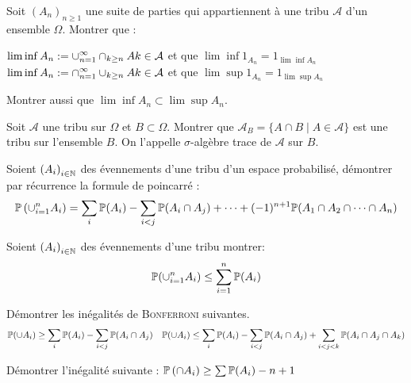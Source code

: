 \documentclass{report}
\begin{document}
\begin{exo}
    Soit \(\left(A_n\right)_{n\geq1}\) une suite de parties qui appartiennent
    à une tribu \(\mathcal{A}\) d'un ensemble \(\Omega\). Montrer que :
    \begin{enumerate}
        \itt \(\displaystyle \lim\inf A_n := \cup_{n=1}^\infty\cap_{k\geq n} Ak \in \mathcal{A}\)
        et que \(\lim\inf 1_{A_n} = 1_{\lim\inf A_n}\)
        \itt \(\displaystyle \lim\inf A_n := \cap_{n=1}^\infty\cup_{k\geq n} Ak \in \mathcal{A}\)
        et que \(\lim\sup 1_{A_n} = 1_{\lim\sup A_n}\)
    \end{enumerate}
    Montrer aussi que \(\lim\inf A_n\subset\lim\sup A_n\).
\end{exo}

\begin{exo}
    Soit \(\mathcal{A}\) une tribu sur \(\Omega\) et \(B\subset\Omega\). Montrer que
    \(\mathcal{A}_B=\{A\cap B\mid A\in\mathcal{A}\}\) est une tribu sur
    l'ensemble \(B\). On l'appelle \(\sigma\)-algèbre trace de \(\mathcal{A}\) sur \(B\).
\end{exo}

\begin{exo}
    Soient \(\left(A_i\right)_{i\in\mathbb{N}}\) des évennements d'une tribu d'un espace
    probabilisé, démontrer par récurrence la formule de poincarré :
    \[\mathbb{P}\left(\cup_{i=1}^nA_i\right)=\sum_i\mathbb{P}(A_i)-\sum_{i<j}\mathbb{P}(A_i\cap A_j)
    + \dots + (-1)^{n+1}\mathbb{P}(A_1\cap A_2 \cap\dots\cap A_n)\]
\end{exo}

\begin{exo}
    Soient \(\left(A_i\right)_{i\in\mathbb{N}}\) des évennements d'une tribu montrer:
    \[ \mathbb{P}(\cup_{i=1}^nA_i)\leq \sum_{i=1}^n\mathbb{P}(A_i)\]
\end{exo}

\begin{exo}
    Démontrer les inégalités de \textsc{Bonferroni} suivantes.
    \[\mathbb{P}(\cup A_i)\geq \sum_i \mathbb{P}(A_i)-\sum_{i<j}\mathbb{P}(A_i\cap A_j)\quad
    \mathbb{P}(\cup A_i)\leq\sum_i \mathbb{P}(A_i)-\sum_{i<j}\mathbb{P}(A_i\cap A_j)+
    \sum_{i<j<k}\mathbb{P}(A_i\cap A_j\cap A_k)\]
\end{exo}

\begin{exo}
    Démontrer l'inégalité suivante : \(\mathbb{P}\left(\cap A_i\right)\geq\sum\mathbb{P}(A_i)-n+1\)
\end{exo}
\end{document}
